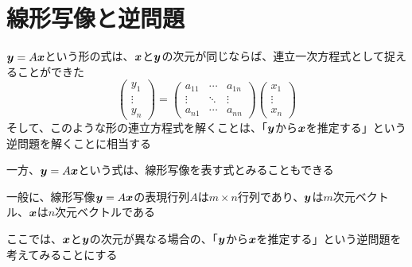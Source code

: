 \documentclass[../../../topic_linear-algebra]{subfiles}
\begin{document}
\sectionline
\section{線形写像と逆問題}

$\vb*{y} = A\vb*{x}$という形の式は、$\vb*{x}$と$\vb*{y}$の次元が同じならば、連立一次方程式として捉えることができた
\begin{equation*}
  \begin{pmatrix}
    y_1    \\
    \vdots \\
    y_n
  \end{pmatrix} = \begin{pmatrix}
    a_{11} & \cdots & a_{1n} \\
    \vdots & \ddots & \vdots \\
    a_{n1} & \cdots & a_{nn}
  \end{pmatrix} \begin{pmatrix}
    x_1    \\
    \vdots \\
    x_n
  \end{pmatrix}
\end{equation*}
そして、このような形の連立方程式を解くことは、「$\vb*{y}$から$\vb*{x}$を推定する」という逆問題を解くことに相当する

\br

一方、$\vb*{y} = A\vb*{x}$という式は、線形写像を表す式とみることもできる

一般に、線形写像$\vb*{y} = A\vb*{x}$の表現行列$A$は$m \times n$行列であり、$\vb*{y}$は$m$次元ベクトル、$\vb*{x}$は$n$次元ベクトルである

\br

ここでは、$\vb*{x}$と$\vb*{y}$の次元が異なる場合の、「$\vb*{y}$から$\vb*{x}$を推定する」という逆問題を考えてみることにする
\end{document}
